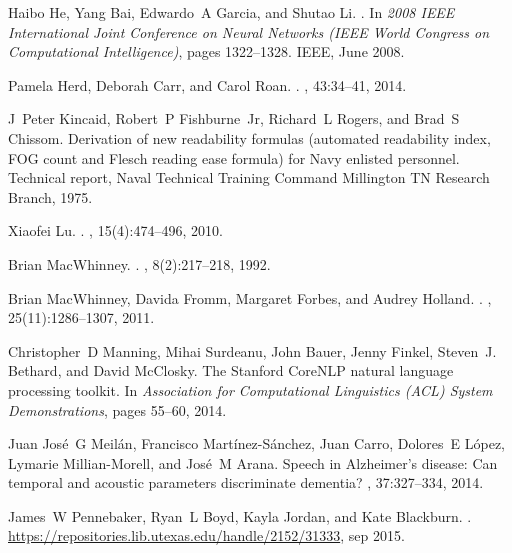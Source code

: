 \documentclass{article}
\begin{document}
\begin{thebibliography}{10}
{Haibo He}, {Yang Bai}, Edwardo~A Garcia, and {Shutao Li}.
.
\newblock In {\em 2008 IEEE International Joint Conference on Neural Networks
  (IEEE World Congress on Computational Intelligence)}, pages 1322--1328. IEEE,
  June 2008.

Pamela Herd, Deborah Carr, and Carol Roan.
.
, 43:34--41, 2014.

J~Peter Kincaid, Robert~P Fishburne~Jr, Richard~L Rogers, and Brad~S Chissom.
\newblock Derivation of new readability formulas (automated readability index,
  {FOG} count and {F}lesch reading ease formula) for {N}avy enlisted personnel.
\newblock Technical report, Naval Technical Training Command Millington TN
  Research Branch, 1975.

Xiaofei Lu.
.
, 15(4):474--496,
  2010.

Brian MacWhinney.
.
, 8(2):217--218, 1992.

Brian MacWhinney, Davida Fromm, Margaret Forbes, and Audrey Holland.
.
, 25(11):1286--1307, 2011.

Christopher~D Manning, Mihai Surdeanu, John Bauer, Jenny Finkel, Steven~J.
  Bethard, and David McClosky.
\newblock The {Stanford} {CoreNLP} natural language processing toolkit.
\newblock In {\em Association for Computational Linguistics (ACL) System
  Demonstrations}, pages 55--60, 2014.

Juan Jos\'{e}~G Meil{\'{a}}n, Francisco Mart{\'{i}}nez-S{\'{a}}nchez, Juan
  Carro, Dolores~E L{\'{o}}pez, Lymarie Millian-Morell, and Jos\'{e}~M Arana.
\newblock Speech in {A}lzheimer's disease: {C}an temporal and acoustic
  parameters discriminate dementia?
, 37:327--334, 2014.

James~W Pennebaker, Ryan~L Boyd, Kayla Jordan, and Kate Blackburn.
.
\newblock \url{https://repositories.lib.utexas.edu/handle/2152/31333}, sep
  2015.


\end{thebibliography}
\end{document}
